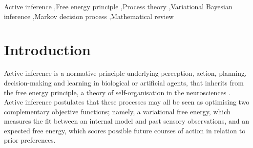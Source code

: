 \documentclass[review,12pt,authoryear]{elsarticle}
\begin{document}
\begin{frontmatter}

\begin{keyword}
Active inference \sep Free energy principle \sep Process theory \sep Variational Bayesian inference \sep Markov decision process \sep Mathematical review


\end{keyword}


\end{frontmatter}
\tableofcontents

\linenumbers
\section{Introduction}
Active inference is a normative principle underlying perception, action, planning, decision-making and learning in biological or artificial agents, that inherits from the free energy principle, a theory of self-organisation in the neurosciences \citep{fristonFreeEnergyPrinciple2006,fristonFreeEnergyPrinciple2019,buckleyFreeEnergyPrinciple2017}. Active inference postulates that these processes may all be seen as optimising two complementary objective functions; namely, a variational free energy, which measures the fit between an internal model and past sensory observations, and an expected free energy, which scores possible future courses of action in relation to prior preferences.
\end{document}

